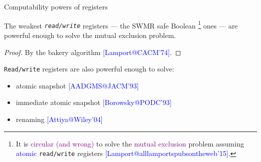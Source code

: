 \documentclass{beamer}
\makeatletter
\newcommand{\citeinbeamer}[3]{{\scriptsize{\textcolor{blue}{[#1@#2'#3]}}}}
\newcommand{\purple}[1]{\textcolor{purple}{#1}}
\newcommand{\largepurple}[1]{\textcolor{purple}{\large #1}}
\newcommand{\blue}[1]{\textcolor{blue}{#1}}
\newcommand{\largeblue}[1]{\textcolor{blue}{\large #1}}
\makeatother
\begin{document}
\begin{frame}{Computability powers of registers}
%
%

  \begin{theorem}
    The weakest \texttt{\it read/write} registers --- the SWMR safe
    Boolean
    \footnote[frame]{It is \purple{circular (and wrong)} to solve
    the \purple{mutual exclusion} problem assuming \blue{atomic}
    \texttt{read/write} registers
    \citeinbeamer{Lamport}{alllamportspubsontheweb}{15}.}
    ones --- are powerful enough to solve the mutual exclusion problem.
  \end{theorem}

  \begin{proof}
    By the bakery algorithm \citeinbeamer{Lamport}{CACM}{74}.
  \end{proof}

  \begin{block}{\texttt{Read/write} registers are also powerful enough to
  solve:}
    \begin{itemize}
      \item atomic snapshot \citeinbeamer{AADGMS}{JACM}{93}
      \item immediate atomic snapshot \citeinbeamer{Borowsky}{PODC}{93}
      \item renaming \citeinbeamer{Attiya}{Wiley}{04}
    \end{itemize}
  \end{block}
\end{frame}
\end{document}
